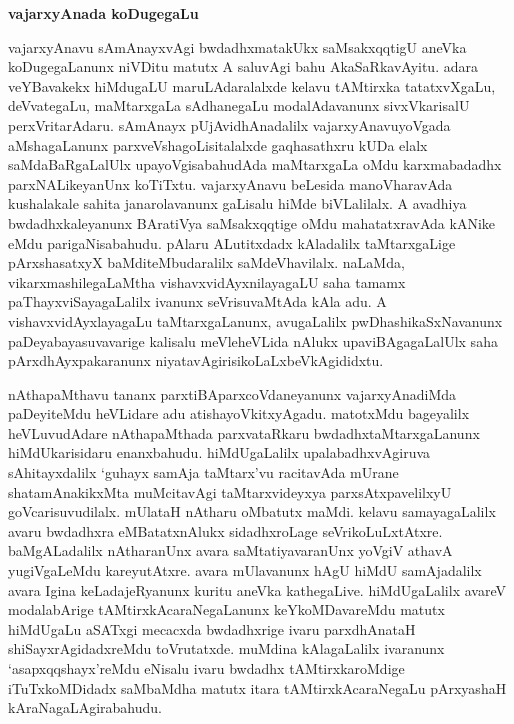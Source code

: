 \begin{center}
{\Large\bf vajarxyAnada koDugegaLu}
\end{center}

vajarxyAnavu sAmAnayxvAgi bwdadhxmatakUkx saMsakxqqtigU aneVka koDuge\-gaLanunx niVDitu matutx A saluvAgi bahu AkaSaRkavAyitu. adara veYBavakekx hiMdugaLU maruLAdaralalxde kelavu tAMtirxka tatatxvXgaLu, deVvategaLu, maMtarxgaLa sAdhanegaLu modalA\-davanunx sivxVkarisalU perxVritarAdaru. sAmAnayx pUjAvidhAnadalilx vajarxyAnavu\break yoVgada aMshagaLanunx parxveVshagoLisitalalxde gaqhasathxru kUDa elalx saMdaBaRgaLalUlx upa\-yoVgisabahudAda maMtarxgaLa oMdu karxmabadadhx parxNALikeyanUnx koTiTxtu. vajarx\break\-yAnavu beLesida manoVharavAda kushalakale sahita janarolavanunx gaLisalu hiMde biVLalilalx. A avadhiya bwdadhxkaleyanunx BAratiVya saMsakxqqtige oMdu mahatatxravAda kANike eMdu parigaNisabahudu. pAlaru ALutitxdadx kAladalilx taMtarxgaLige pArxshasatxyX baMditeMbudaralilx saMdeVhavilalx. naLaMda, vikarxmashilegaLaMtha vishavxvidAyxnilayagaLU saha tamamx paThayxviSayagaLalilx ivanunx seVrisuvaMtAda kAla adu. A vishavxvidAyxlayagaLu taMtarxgaLanunx, avugaLalilx pwDhashikaSxNavanunx paDeyabayasuvavarige kalisalu meVle\break heVLida nAlukx upaviBAgagaLalUlx saha pArxdhAyxpakaranunx niyatavAgirisikoLaLxbeVkAgi\-didxtu.

nAthapaMthavu tananx parxtiBAparxcoVdaneyanunx vajarxyAnadiMda paDeyiteMdu heVLi\-dare adu atishayoVkitxyAgadu. matotxMdu bageyalilx heVLuvudAdare nAthapaMthada parxvataRkaru bwdadhxtaMtarxgaLanunx hiMdUkarisidaru enanxbahudu. hiMdUgaLalilx upalabadhxvAgiruva sAhitayxdalilx `guhayx samAja taMtarx'vu racitavAda mUrane shatamAnakikxMta muMcitavAgi taMtarxvideyxya parxsAtxpavelilxyU goVcarisuvudilalx. mUlataH nAtharu oMbatutx maMdi. kelavu samayagaLalilx avaru bwdadhxra eMBatatxnAlukx sidadhxroLage seVrikoLuLxtAtxre. baMgALadalilx nAtharanUnx avara saMtatiyavaranUnx yoVgiV athavA yugiVgaLeMdu kareyutAtxre. avara mUlavanunx hAgU hiMdU samAjadalilx avara Igina keLadajeRyanunx kuritu aneVka kathegaLive. hiMdUgaLalilx avareV modalabArige tAMtirxkAcaraNegaLanunx keYkoMDavareMdu matutx hiMdUgaLu aSATxgi mecacxda bwdadhxrige ivaru parxdhAnataH shiSayxrAgidadxreMdu toVrutatxde. muMdina kAlagaLalilx ivaranunx `asapxqqshayx'reMdu eNisalu ivaru bwdadhx tAMtirxkaroMdige iTuTxkoMDidadx saMbaMdha matutx itara tAMtirxkAcaraNegaLu pArxyashaH kAraNagaLAgirabahudu.

